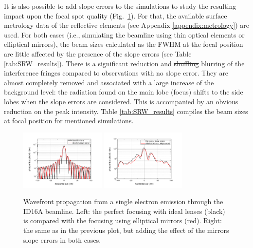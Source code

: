 \documentclass{iucr}              %
\begin{document}
It is also possible to add slope errors to the simulations to study the resulting impact upon the focal spot quality (Fig.~\ref{fig:SingleElectron}). For that, the available surface metrology data of the reflective elements (see Appendix \ref{appendix:metrology})  are used. For both cases (i.e., simulating the beamline using thin optical elements or elliptical mirrors), the beam sizes calculated as the FWHM at the focal position are little affected by the presence of the slope errors (see Table \ref{tab:SRW_results}). There is a significant reduction and {\color{green}\sout{shuffling} blurring} of the interference fringes compared to observations with no slope error. They are almost completely removed and associated with a large increase of the background level: the radiation found on the main lobe (focus) shifts to the side lobes when the slope errors are considered. This is accompanied by an obvious reduction on the peak intensity. Table \ref{tab:SRW_results} compiles the beam sizes at focal position for mentioned simulations.

\begin{figure}
    \centering
        \includegraphics[width=4.25cm]{GRAPHICS/se_idealTE_idealOE_h.pdf}
        \includegraphics[width=4.25cm]{GRAPHICS/ebs_slopeTE_slopeOE_h.pdf}
    \label{fig:SingleElectron}
    \caption{Wavefront propagation from a single electron emission through the ID16A beamline. Left: the perfect focusing with ideal lenses (black) is compared with the focusing using elliptical mirrors (red). Right: the same as in the previous plot, but adding the effect of the mirrors slope errors in both cases.}
\end{figure}
\end{document}
